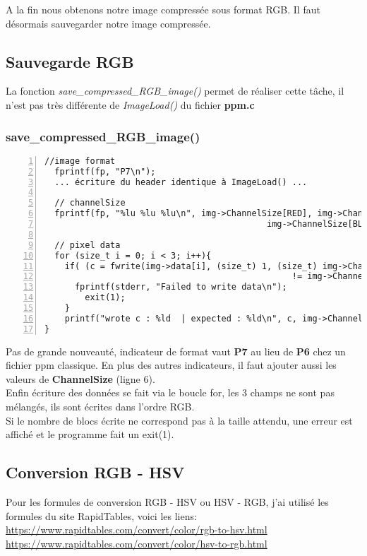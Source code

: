 \documentclass[12pt, letterpaper]{article}
\begin{document}
\break
A la fin nous obtenons notre image compressée sous format RGB. Il faut désormais sauvegarder notre image compressée. 
\subsection{Sauvegarde RGB}
La fonction \textit{save\_compressed\_RGB\_image()} permet de réaliser cette tâche, il n'est pas très différente de \textit{ImageLoad()} du fichier \textbf{ppm.c}
\subsubsection{save\_compressed\_RGB\_image()}

\begin{Verbatim}[numbers=left,xleftmargin = 5mm]
  //image format
  fprintf(fp, "P7\n");
  ... écriture du header identique à ImageLoad() ... 

  // channelSize 
  fprintf(fp, "%lu %lu %lu\n", img->ChannelSize[RED], img->ChannelSize[GREEN], 
                                            img->ChannelSize[BLUE]);
    
  // pixel data
  for (size_t i = 0; i < 3; i++){
    if( (c = fwrite(img->data[i], (size_t) 1, (size_t) img->ChannelSize[i], fp))
                                                 != img->ChannelSize[i]){
      fprintf(stderr, "Failed to write data\n");
        exit(1);
    }
    printf("wrote c : %ld  | expected : %ld\n", c, img->ChannelSize[i]);
}
\end{Verbatim}
Pas de grande nouveauté, indicateur de format vaut \textbf{P7} au lieu de 
\textbf{P6} chez un fichier ppm classique. En plus des autres indicateurs, il faut ajouter 
aussi les valeurs de \textbf{ChannelSize} (ligne 6).\\
Enfin écriture des données se fait via le boucle for, les 3 champs ne sont pas mélangés, ils sont écrites dans l'ordre RGB.\\
Si le nombre de blocs écrite ne correspond pas à la taille attendu, une erreur est affiché et le programme fait un exit(1).

\subsection{Conversion RGB - HSV}
Pour les formules de conversion RGB - HSV ou HSV - RGB, j'ai utilisé les formules du site RapidTables, voici les liens:\\
\url{https://www.rapidtables.com/convert/color/rgb-to-hsv.html}\\
\url{https://www.rapidtables.com/convert/color/hsv-to-rgb.html}
\end{document}
